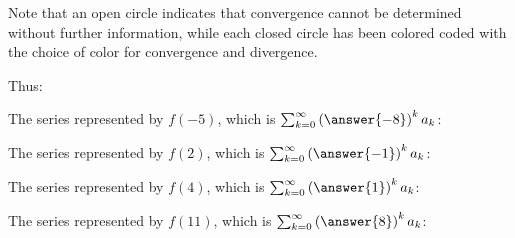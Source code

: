 \documentclass{ximera}
\begin{document}
\begin{exercise}
\begin{exercise}
\begin{image}
\end{image}


Note that an open circle indicates that convergence cannot be determined without further information, while each closed circle has been colored coded with the choice of color for convergence and divergence.

Thus:

\begin{exercise}
The series represented by $f(-5)$, which is $\sum_{k=0}^{\infty} \left(\answer{-8}\right)^k a_k$:
\begin{multipleChoice}
\end{multipleChoice}
\end{exercise}

 \begin{exercise}
The series  represented by $f(2)$, which is $\sum_{k=0}^{\infty} \left(\answer{-1}\right)^k a_k$:
\begin{multipleChoice}
\end{multipleChoice}
\end{exercise}

\begin{exercise}
The series  represented by $f(4)$, which is $\sum_{k=0}^{\infty} \left(\answer{1}\right)^k a_k$:
\begin{multipleChoice}
\end{multipleChoice}
\end{exercise}

\begin{exercise}
The series  represented by $f(11)$, which is $\sum_{k=0}^{\infty} \left(\answer{8}\right)^k a_k$:
\begin{multipleChoice}
\end{multipleChoice}
\end{exercise}


\end{exercise}
\end{exercise}
\end{document}
